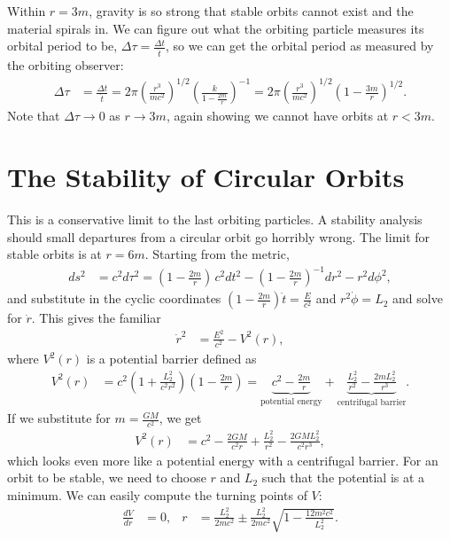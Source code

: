 \documentclass[a4paper, 11pt, normalem]{report}
\begin{document}
Within $r=3m$, gravity is so strong that stable orbits cannot exist and the material spirals in. 
We can figure out what the orbiting particle measures its orbital period to be, $\Delta\tau=\frac{\Delta t}{\dot{t}}$, so we can get the orbital period as measured by the orbiting observer:
\begin{align}
    \Delta\tau &= \frac{\Delta t}{\dot{t}} = 2\pi\left(\frac{r^3}{mc^2}\right)^{1/2}\left(\frac{k}{1-\frac{2m}{r}}\right)^{-1} = 2\pi\left(\frac{r^3}{mc^2}\right)^{1/2}\left(1-\frac{3m}{r}\right)^{1/2}.
\end{align}
Note that $\Delta\tau\to0$ as $r\to3m$, again showing we cannot have orbits at $r<3m$.

\section{The Stability of Circular Orbits}
This is a conservative limit to the last orbiting particles. 
A stability analysis should small departures from a circular orbit go horribly wrong. 
The limit for stable orbits is at $r=6m$. 
Starting from the metric,
\begin{align}
    ds^2 &= c^2d\tau^2 = \left(1-\frac{2m}{r}\right)\,c^2dt^2 - \left(1-\frac{2m}{r}\right)^{-1}dr^2 - r^2d\phi^2,
\end{align}
and substitute in the cyclic coordinates $\left(1-\frac{2m}{r}\right)\dot{t} = \frac{E}{c^2}$ and $r^2\dot{\phi}=L_2$ and solve for $\dot{r}$.
This gives the familiar
\begin{align}
    \dot{r}^2 &= \frac{E^2}{c^2} - V^2(r),
\end{align}
where $V^2(r)$ is a potential barrier defined as
\begin{align}
    V^2(r) &= c^2\left(1+\frac{L_2^2}{c^2r^2}\right)\left(1-\frac{2m}{r}\right) = \underbrace{c^2 - \frac{2m}{r}}_{\text{potential energy}} + \underbrace{\frac{L_2^2}{r^2} - \frac{2mL_2^2}{r^3}}_{\text{centrifugal barrier}}.
\end{align}
If we substitute for $m=\frac{GM}{c^2}$, we get
\begin{align}
    V^2(r) &= c^2-\frac{2GM}{c^2r}+\frac{L_2^2}{r^2}-\frac{2GML_2^2}{c^2r^3},
\end{align}
which looks even more like a potential energy with a centrifugal barrier. 
For an orbit to be stable, we need to choose $r$ and $L_2$ such that the potential is at a minimum. 
We can easily compute the turning points of $V$:
\begin{align}
    \frac{dV}{dr} &= 0, & r &= \frac{L_2^2}{2mc^2} \pm \frac{L_2^2}{2mc^2}\sqrt{1-\frac{12m^2c^2}{L_2^2}}.
\end{align}
\end{document}
